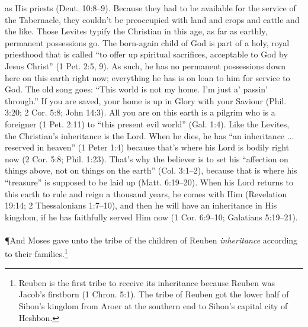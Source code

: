 {as His priests (Deut. 10:8–9). Because they had
to be available for the service of the Tabernacle,
they couldn’t be preoccupied with land and
crops and cattle and the like.
Those Levites typify the Christian in this
age, as far as earthly, permanent possessions go.
The born-again child of God is part of a holy,
royal priesthood that is called “to offer up
spiritual sacrifices, acceptable to God by
Jesus Christ” (1 Pet. 2:5, 9). As such, he has
no permanent possessions down here on this
earth right now; everything he has is on loan to
him for service to God.
The old song goes: “This world is not my
home. I’m just a’ passin’ through.” If you are
saved, your home is up in Glory with your
Saviour (Phil. 3:20; 2 Cor. 5:8; John 14:3). All
you are on this earth is a pilgrim who is a
foreigner (1 Pet. 2:11) to “this present evil
world” (Gal. 1:4).
Like the Levites, the Christian's inheritance is the Lord. When he dies, he has ``an inheritance $\hdots$ reserved in heaven'' (1 Peter 1:4) because that's where his Lord is bodily right now (2 Cor. 5:8; Phil. 1:23). That's why the believer is to set his ``affection on things above, not on things on the earth'' (Col. 3:1--2), because that is where his ``treasure'' is supposed to be laid up (Matt. 6:19--20). When his Lord returns to this earth to rule and reign a thousand years, he comes with Him (Revelation 19:14; 2 Thessalonians 1:7--10), and then he will have an inheritance in His kingdom, if he has faithfully served Him now (1 Cor. 6:9--10; Galatians 5:19--21).}\\
\\
\P  \textcolor[rgb]{0.00,0.00,1.00}{And Moses gave unto the tribe of the children of Reuben \emph{inheritance} according to their families.}\footnote{Reuben is the first tribe to receive its inheritance because Reuben was Jacob’s firstborn (1 Chron. 5:1). The tribe of Reuben got the lower half of Sihon’s kingdom from Aroer at the southern end to Sihon’s capital city of Heshbon.}
